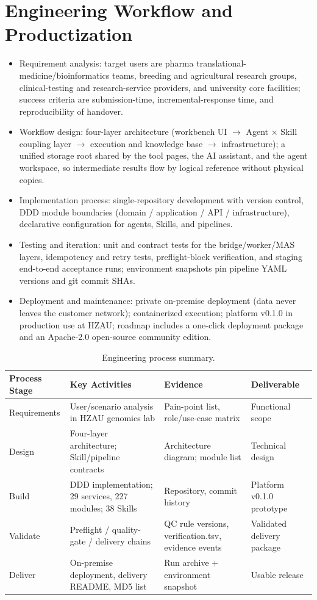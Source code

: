 \documentclass[11pt,a4paper]{article}
\begin{document}
\section{Engineering Workflow and Productization}

\begin{itemize}
  \item Requirement analysis: target users are pharma translational-medicine/bioinformatics teams, breeding and agricultural research groups, clinical-testing and research-service providers, and university core facilities; success criteria are submission-time, incremental-response time, and reproducibility of handover.
  \item Workflow design: four-layer architecture (workbench UI $\rightarrow$ Agent $\times$ Skill coupling layer $\rightarrow$ execution and knowledge base $\rightarrow$ infrastructure); a unified storage root shared by the tool pages, the AI assistant, and the agent workspace, so intermediate results flow by logical reference without physical copies.
  \item Implementation process: single-repository development with version control, DDD module boundaries (domain / application / API / infrastructure), declarative configuration for agents, Skills, and pipelines.
  \item Testing and iteration: unit and contract tests for the bridge/worker/MAS layers, idempotency and retry tests, preflight-block verification, and staging end-to-end acceptance runs; environment snapshots pin pipeline YAML versions and git commit SHAs.
  \item Deployment and maintenance: private on-premise deployment (data never leaves the customer network); containerized execution; platform v0.1.0 in production use at HZAU; roadmap includes a one-click deployment package and an Apache-2.0 open-source community edition.
\end{itemize}

\begin{table}[h]
\centering
\renewcommand{\arraystretch}{1.25}
\begin{tabularx}{\textwidth}{p{}X X X}
\toprule
\textbf{Process Stage} & \textbf{Key Activities} & \textbf{Evidence} & \textbf{Deliverable}\\
\midrule
Requirements & User/scenario analysis in HZAU genomics lab & Pain-point list, role/use-case matrix & Functional scope\\
Design & Four-layer architecture; Skill/pipeline contracts & Architecture diagram; module list & Technical design\\
Build & DDD implementation; 29 services, 227 modules; 38 Skills & Repository, commit history & Platform v0.1.0 prototype\\
Validate & Preflight / quality-gate / delivery chains & QC rule versions, verification.tsv, evidence events & Validated delivery package\\
Deliver & On-premise deployment, delivery README, MD5 list & Run archive + environment snapshot & Usable release\\
\bottomrule
\end{tabularx}
\caption{Engineering process summary.}
\end{table}
\end{document}

